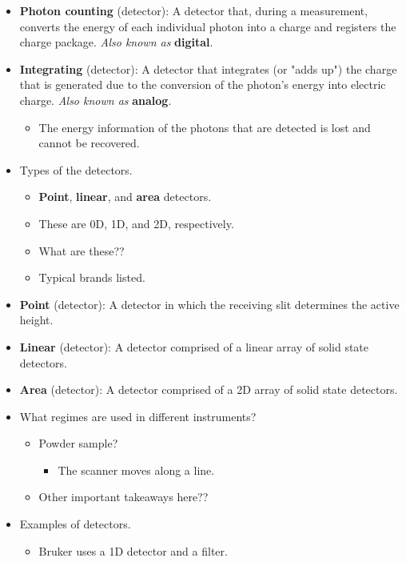 \documentclass[../notes.tex]{subfiles}
\begin{document}
\begin{itemize}
\begin{itemize}
    \end{itemize}
    \item \textbf{Photon counting} (detector): A detector that, during a measurement, converts the energy of each individual photon into a charge and registers the charge package. \emph{Also known as} \textbf{digital}.
    \item \textbf{Integrating} (detector): A detector that integrates (or "adds up") the charge that is generated due to the conversion of the photon's energy into electric charge. \emph{Also known as} \textbf{analog}.
    \begin{itemize}
        \item The energy information of the photons that are detected is lost and cannot be recovered.
    \end{itemize}
    \item Types of the detectors.
    \begin{itemize}
        \item \textbf{Point}, \textbf{linear}, and \textbf{area} detectors.
        \item These are 0D, 1D, and 2D, respectively.
        \item What are these??
        \item Typical brands listed.
    \end{itemize}
    \item \textbf{Point} (detector): A detector in which the receiving slit determines the active height.
    \item \textbf{Linear} (detector): A detector comprised of a linear array of solid state detectors.
    \item \textbf{Area} (detector): A detector comprised of a 2D array of solid state detectors.
    \item What regimes are used in different instruments?
    \begin{itemize}
        \item Powder sample?
        \begin{itemize}
            \item The scanner moves along a line.
        \end{itemize}
        \item Other important takeaways here??
    \end{itemize}
    \item Examples of detectors.
    \begin{itemize}
        \item Bruker uses a 1D detector and a  filter.

\end{itemize}
\end{itemize}
\end{document}
